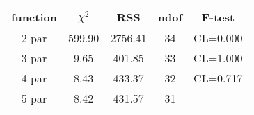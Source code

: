 \begin{tabular}{c|c|c|c|c}
function & $\chi^2$ & RSS & ndof & F-test \\
\hline
2 par & 599.90 & 2756.41 & 34 & CL=0.000 \\
3 par & 9.65 & 401.85 & 33 & CL=1.000 \\
4 par & 8.43 & 433.37 & 32 & CL=0.717 \\
5 par & 8.42 & 431.57 & 31 & \\
\hline
\end{tabular}